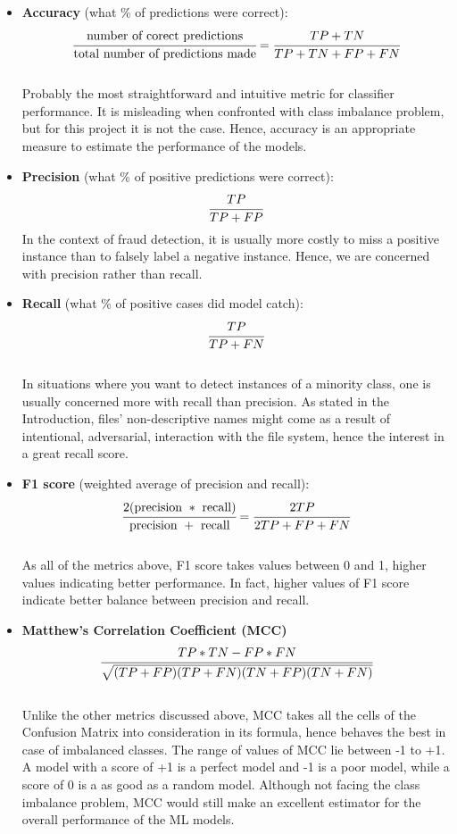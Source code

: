 \begin{itemize}
  \item \textbf{Accuracy} (what \% of predictions were correct): $$ \cfrac{\text{number of corect predictions}}{\text{total number of predictions made}} = \cfrac{TP + TN}{TP + TN + FP + FN}$$ \\
        Probably the most straightforward and intuitive metric for classifier performance. It is misleading when confronted with class imbalance problem, but for this project it is not the case. Hence, accuracy is an appropriate measure to estimate the performance of the models. \\

  \item \textbf{Precision} (what \% of positive predictions were correct): $$ \cfrac{TP}{TP + FP}$$
        In the context of fraud detection, it is usually more costly to miss a positive instance than to falsely label a negative instance. Hence, we are concerned with precision rather than recall. \\

  \item \textbf{Recall} (what \% of positive cases did model catch): $$ \cfrac{TP}{TP + FN}$$ \\
        In situations where you want to detect instances of a minority class, one is usually concerned more with recall than precision. As stated in the Introduction, files' non-descriptive names might come as a result of intentional, adversarial, interaction with the file system, hence the interest in a great recall score.\\

  \item \textbf{F1 score} (weighted average of precision and recall): $$ \cfrac{2(\text{precision} \ * \ \text{recall})}{\text{precision} \ + \ \text{recall}} = \cfrac{2TP}{2TP + FP + FN}$$ \\
        As all of the metrics above, F1 score takes values between 0 and 1, higher values indicating better performance. In fact, higher values of F1 score indicate better balance between precision and recall. \\

  \item \textbf{Matthew's Correlation Coefficient (MCC)} $$ \cfrac{TP * TN - FP * FN}{\sqrt{(TP + FP)(TP + FN)(TN + FP)(TN + FN)}}$$ \\
        Unlike the other metrics discussed above, MCC takes all the cells of the Confusion Matrix into consideration in its formula, hence behaves the best in case of imbalanced classes. The range of values of MCC lie between -1 to +1. A model with a score of +1 is a perfect model and -1 is a poor model, while a score of 0 is a as good as a random model. Although not facing the class imbalance problem, MCC would still make an excellent estimator for the overall performance of the ML models.\\
\end{itemize}

